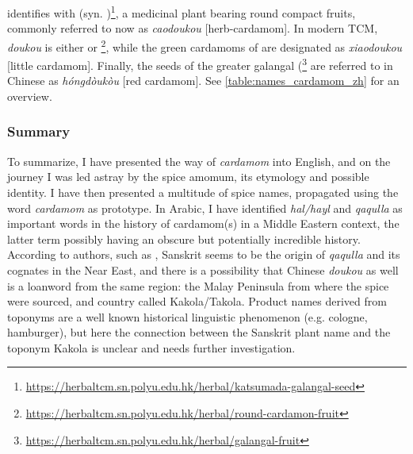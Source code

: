 

\textcite[729]{zhang_dictionary_2015} identifies  with  (syn. )\footnote{\url{https://herbaltcm.sn.polyu.edu.hk/herbal/katsumada-galangal-seed}}, a medicinal plant bearing round compact fruits, commonly referred to now as  \textit{caodoukou} [herb-cardamom]. In modern \gls{TCM}, \textit{doukou} is either  or \footnote{\url{https://herbaltcm.sn.polyu.edu.hk/herbal/round-cardamon-fruit}}, while the green cardamoms of  are designated as  \textit{xiaodoukou} [little cardamom]. Finally, the seeds of the greater galangal (\footnote{\url{https://herbaltcm.sn.polyu.edu.hk/herbal/galangal-fruit}} are referred to in Chinese as 	\textit{hóngdòukòu} [red cardamom]. See \cref{table:names_cardamom_zh} for an overview.








\subsubsection{Summary}

To summarize, I have presented the way of \textit{cardamom} into English, and on the journey I was led astray by the spice amomum, its etymology and possible identity. I have then presented a multitude of spice names, propagated using the word \textit{cardamom} as prototype. In Arabic, I have identified \textit{hal/hayl} and \textit{qaqulla} as important words in the history of cardamom(s) in a Middle Eastern context, the latter term possibly having an obscure but potentially incredible history. According to authors, such as \textcite{donkin_between_2003}, Sanskrit seems to be the origin of \textit{qaqulla} and its cognates in the Near East, and there is a possibility that Chinese \textit{doukou} as well is a loanword from the same region: the Malay Peninsula from where the spice were sourced, and country called Kakola/Takola. Product names derived from toponyms are a well known historical linguistic phenomenon (e.g. cologne, hamburger), but here the connection between the Sanskrit plant name and the toponym Kakola is unclear and needs further investigation.

